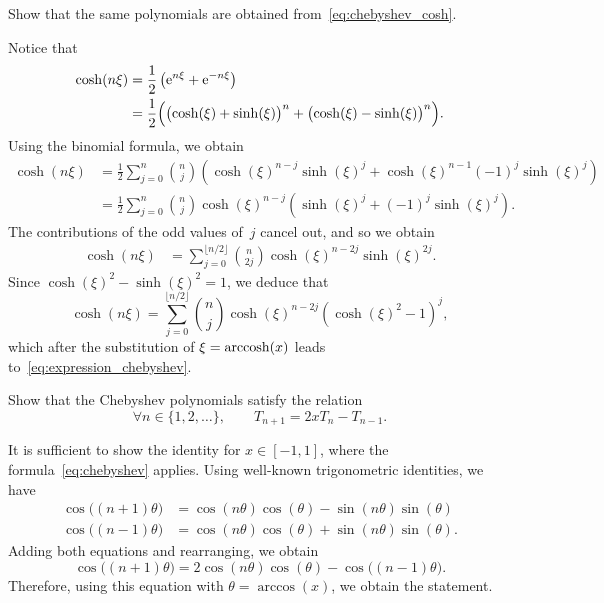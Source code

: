 \begin{exercise}
    Show that the same polynomials are obtained from~\eqref{eq:chebyshev_cosh}.
\end{exercise}
\begin{solution}
    Notice that
    \begin{align*}
        \cosh(n \xi)
        &= \frac{1}{2} \left( \mathrm e^{n \xi} + \mathrm e^{-n \xi} \right) \\
        &= \frac{1}{2} \Bigl( \bigl(\cosh (\xi) + \sinh(\xi)\bigr)^n  + \bigl(\cosh(\xi) - \sinh(\xi)\bigr)^n \Bigr).
    \end{align*}
    Using the binomial formula, we obtain
    \begin{align*}
        \cosh(n \xi)
        &= \frac{1}{2}  \sum_{j=0}^{n} \binom{n}{j} \left( \cosh(\xi)^{n-j} \sinh(\xi)^j + \cosh(\xi)^{n-1} (-1)^j \sinh(\xi)^j \right) \\
        &=  \frac{1}{2} \sum_{j=0}^{n} \binom{n}{j} \cosh(\xi)^{n-j} \left( \sinh(\xi)^j + (-1)^j \sinh(\xi)^j \right).
    \end{align*}
    The contributions of the odd values of~$j$ cancel out,
    and so we obtain
    \begin{align*}
        \cosh(n \xi)
        &=  \sum_{j=0}^{\lfloor n / 2 \rfloor} \binom{n}{2j} \cosh(\xi)^{n-2j} \sinh(\xi)^{2j}.
    \end{align*}
    Since $\cosh(\xi)^2 - \sinh(\xi)^2 = 1$,
    we deduce that
    \[
        \cosh(n \xi)
        =  \sum_{j=0}^{\lfloor n / 2 \rfloor} \binom{n}{j} \cosh(\xi)^{n-2j} (\cosh(\xi)^2 - 1)^{j},
    \]
    which after the substitution of $\xi = \operatorname{arccosh}(x)$ leads to~\eqref{eq:expression_chebyshev}.
\end{solution}

\begin{exercise}
    \label{exercise:recursion_chebyshev}
    Show that the Chebyshev polynomials satisfy the relation
    \begin{equation}
        \label{eq:recursion_chebyshev}
        \forall n \in \{1, 2, \dotsc\},
        \qquad
        T_{n+1} = 2 x T_{n} - T_{n-1}.
    \end{equation}
\end{exercise}
\begin{solution}
    It is sufficient to show the identity for $x \in [-1, 1]$,
    where the formula~\eqref{eq:chebyshev} applies.
    Using well-known trigonometric identities,
    we have
    \begin{align*}
        \cos\bigl((n+1) \theta\bigr) &= \cos(n \theta) \cos(\theta) - \sin(n \theta) \sin (\theta)  \\
        \cos\bigl((n-1) \theta\bigr) &= \cos(n \theta) \cos(\theta) + \sin(n \theta) \sin (\theta).
    \end{align*}
    Adding both equations and rearranging, we obtain
    \[
        \cos\bigl((n+1) \theta\bigr) = 2 \cos(n \theta) \cos (\theta) - \cos\bigl((n-1) \theta\bigr).
    \]
    Therefore, using this equation with $\theta = \arccos(x)$,
    we obtain the statement.
\end{solution}

